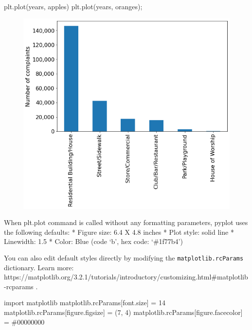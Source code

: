 \documentclass[
  letterpaper,
  DIV=11,
  numbers=noendperiod]{scrreprt}
\newenvironment{Shaded}{\begin{snugshade}}{\end{snugshade}}
\newcommand{\DecValTok}[1]{\textcolor[rgb]{0.68,0.00,0.00}{#1}}
\newcommand{\ImportTok}[1]{\textcolor[rgb]{0.00,0.46,0.62}{#1}}
\newcommand{\NormalTok}[1]{\textcolor[rgb]{0.00,0.23,0.31}{#1}}
\newcommand{\OperatorTok}[1]{\textcolor[rgb]{0.37,0.37,0.37}{#1}}
\newcommand{\StringTok}[1]{\textcolor[rgb]{0.13,0.47,0.30}{#1}}
\begin{document}
\begin{Shaded}
\begin{Highlighting}[]
\NormalTok{plt.plot(years, apples)}
\NormalTok{plt.plot(years, oranges)}\OperatorTok{;}
\end{Highlighting}
\end{Shaded}

\begin{figure}[H]

{\centering \includegraphics{Data visualization_files/figure-pdf/cell-20-output-1.png}

}

\end{figure}

When plt.plot command is called without any formatting parameters,
pyplot uses the following defaults: * Figure size: 6.4 X 4.8 inches *
Plot style: solid line * Linewidth: 1.5 * Color: Blue (code `b', hex
code: `\#1f77b4')

You can also edit default styles directly by modifying the
\texttt{matplotlib.rcParams} dictionary. Learn more:
https://matplotlib.org/3.2.1/tutorials/introductory/customizing.html\#matplotlib-rcparams
.

\begin{Shaded}
\begin{Highlighting}[]
\ImportTok{import}\NormalTok{ matplotlib}
\NormalTok{matplotlib.rcParams[}\StringTok{\textquotesingle{}font.size\textquotesingle{}}\NormalTok{] }\OperatorTok{=} \DecValTok{14}
\NormalTok{matplotlib.rcParams[}\StringTok{\textquotesingle{}figure.figsize\textquotesingle{}}\NormalTok{] }\OperatorTok{=}\NormalTok{ (}\DecValTok{7}\NormalTok{, }\DecValTok{4}\NormalTok{)}
\NormalTok{matplotlib.rcParams[}\StringTok{\textquotesingle{}figure.facecolor\textquotesingle{}}\NormalTok{] }\OperatorTok{=} \StringTok{\textquotesingle{}\#00000000\textquotesingle{}}
\end{Highlighting}
\end{Shaded}
\end{document}
